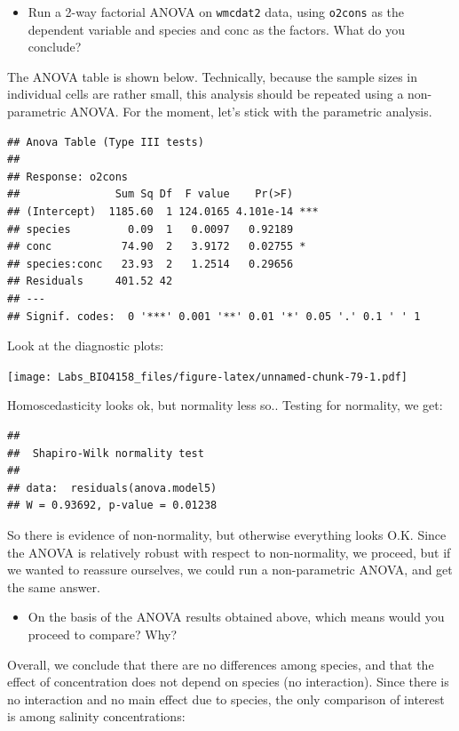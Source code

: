 \documentclass[
  12pt,
]{book}
\providecommand{\tightlist}{%
  \setlength{\itemsep}{0pt}\setlength{\parskip}{0pt}}
\begin{document}
\begin{itemize}
\tightlist
\item
  Run a 2-way factorial ANOVA on \texttt{wmcdat2} data, using \texttt{o2cons} as the dependent variable and species and conc as the factors. What do you conclude?
\end{itemize}

The ANOVA table is shown below. Technically, because the sample sizes in individual cells are rather small, this analysis should be repeated using a non-parametric ANOVA. For the moment, let's stick with the parametric analysis.

\begin{verbatim}
## Anova Table (Type III tests)
## 
## Response: o2cons
##               Sum Sq Df  F value    Pr(>F)    
## (Intercept)  1185.60  1 124.0165 4.101e-14 ***
## species         0.09  1   0.0097   0.92189    
## conc           74.90  2   3.9172   0.02755 *  
## species:conc   23.93  2   1.2514   0.29656    
## Residuals     401.52 42                       
## ---
## Signif. codes:  0 '***' 0.001 '**' 0.01 '*' 0.05 '.' 0.1 ' ' 1
\end{verbatim}

Look at the diagnostic plots:

\texttt{[image: Labs\_BIO4158\_files/figure-latex/unnamed-chunk-79-1.pdf]}

Homoscedasticity looks ok, but normality less so.. Testing for
normality, we get:

\begin{verbatim}
## 
##  Shapiro-Wilk normality test
## 
## data:  residuals(anova.model5)
## W = 0.93692, p-value = 0.01238
\end{verbatim}

So there is evidence of non-normality, but otherwise everything looks O.K. Since the ANOVA is relatively robust with respect to non-normality, we proceed, but if we wanted to reassure ourselves, we could run a non-parametric ANOVA, and get the same answer.

\begin{itemize}
\tightlist
\item
  On the basis of the ANOVA results obtained above, which means would you proceed to compare? Why?
\end{itemize}

Overall, we conclude that there are no differences among species, and that the effect of concentration does not depend on species (no interaction). Since there is no interaction and no main effect due to species, the only comparison of interest is among salinity concentrations:
\end{document}
